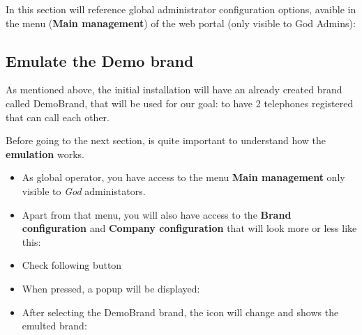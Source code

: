 \documentclass[letterpaper,10pt,english]{sphinxmanual}
\begin{document}
In this section will reference global administrator configuration options,
avaible in the menu (\textbf{Main management}) of the web portal (only visible to
God Admins):


\subsection{Emulate the Demo brand}
\label{getting_started/internal_calls/god_portal:emulate-the-demo-brand}
As mentioned above, the initial installation will have an already created brand
called DemoBrand, that will be used for our goal: to have 2 telephones registered
that can call each other.

Before going to the next section, is quite important to understand how the
\textbf{emulation} works.
\begin{itemize}
\item {} 
As global operator, you have access to the menu \textbf{Main management} only
visible to \emph{God} administators.

\item {} 
Apart from that menu, you will also have access to the \textbf{Brand configuration}
and \textbf{Company configuration} that will look more or less like this:

\end{itemize}

\begin{itemize}
\item {} 
Check following button

\end{itemize}

\begin{itemize}
\item {} 
When pressed, a popup will be displayed:

\end{itemize}

\begin{itemize}
\item {} 
After selecting the DemoBrand brand, the icon will change and shows the
emulted brand:

\end{itemize}
\end{document}
